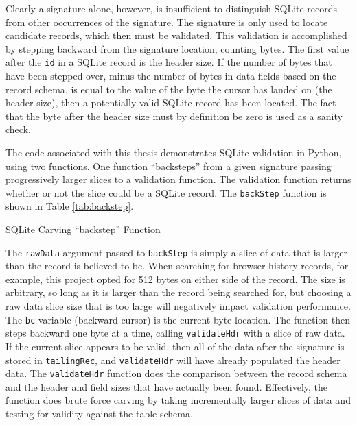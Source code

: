Clearly a signature alone, however, is insufficient to distinguish SQLite records from other occurrences of the signature.  The
signature is only used to locate candidate records, which then must be validated.  This validation is accomplished by stepping
backward from the signature location, counting bytes.  The first value after the \texttt{id} in a SQLite record is the header size.
If the number of bytes that have been stepped over, minus the number of bytes in data fields based on the record schema, is equal to
the value of the byte the cursor has landed on (the header size), then a potentially valid SQLite record has been located.  The fact
that the byte after the header size must by definition be zero is used as a sanity check.

The code associated with this thesis demonstrates SQLite validation in Python, using two functions.  One function ``backsteps'' from
a given signature passing progressively larger slices to a validation function.  The validation function returns whether or not the
slice could be a SQLite record.  The \texttt{backStep} function is shown in Table \ref{tab:backstep}. 

\begin{table}[htb]

\caption{SQLite Carving ``backstep'' Function}
\label{tab:backstep}
\end{table}

The \texttt{rawData} argument passed to \texttt{backStep} is simply a slice of data that is larger than the record is believed to
be.  When searching for browser history records, for example, this project opted for 512 bytes on either side of the record.  The
size is arbitrary, so long as it is larger than the record being searched for, but choosing a raw data slice size that is too large
will negatively impact validation performance.  The \texttt{bc} variable (backward cursor) is the current byte location.  The
function then steps backward one byte at a time, calling \texttt{validateHdr} with a slice of raw data.  If the current
slice appears to be valid, then all of the data after the signature is stored in \texttt{tailingRec}, and \texttt{validateHdr} will
have already populated the header data.  The \texttt{validateHdr} function does the comparison between the record schema and
the header and field sizes that have actually been found.  Effectively, the function does brute force carving by taking
incrementally larger slices of data and testing for validity against the table schema.

